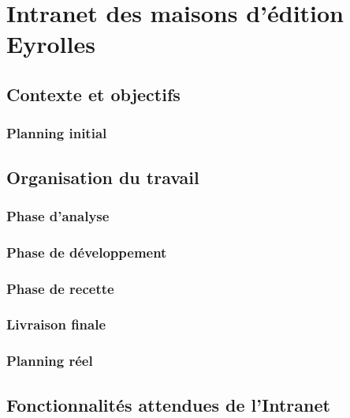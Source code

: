 \section{Intranet des maisons d'édition Eyrolles}

\subsection{Contexte et objectifs}

\subsubsection{Planning initial}

\subsection{Organisation du travail}

\subsubsection{Phase d'analyse}

\subsubsection{Phase de développement}

\subsubsection{Phase de recette}

\subsubsection{Livraison finale}

\subsubsection{Planning réel}

\subsection{Fonctionnalités attendues de l'Intranet}


